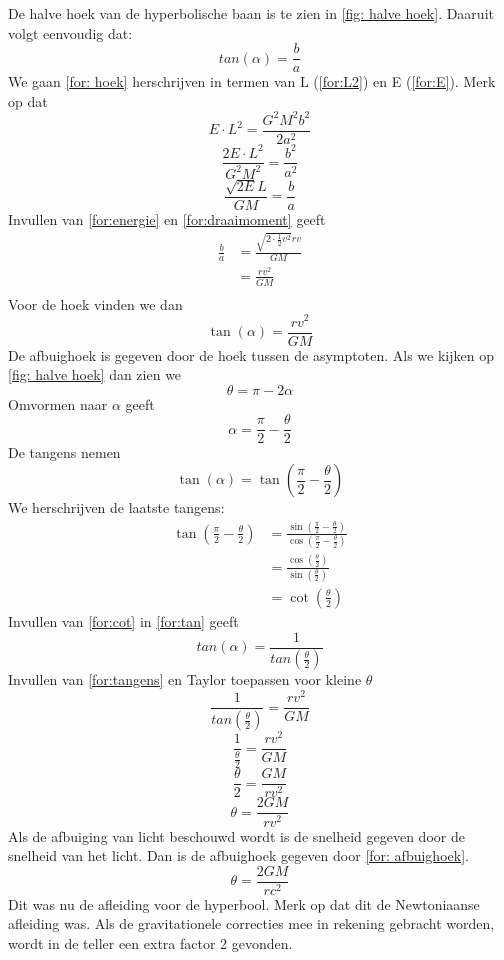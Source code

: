 De halve hoek van de hyperbolische baan is te zien in \cref{fig: halve hoek}. Daaruit volgt eenvoudig dat:
\begin{equation}
    tan(\alpha) = \frac{b}{a}
    \label{for: hoek}
\end{equation}
We gaan \cref{for: hoek} herschrijven in termen van L (\cref{for:L2}) en E (\cref{for:E}).
Merk op dat
$$E\cdot L^{2}=\frac{G^{2}M^{2}b^{2}}{2a^{2}}$$
$$\frac{2E\cdot L^{2}}{G^{2}M^{2}}=\frac{b^{2}}{a^{2}}$$
$$\frac{\sqrt{2E}L}{GM}=\frac{b}{a}$$
Invullen van \cref{for:energie} en \cref{for:draaimoment} geeft
\begin{align}
    \frac{b}{a}&=\frac{\sqrt{2\cdot\frac{1}{2}v^{2}}rv}{GM}\nonumber \\
     &= \frac{rv^{2}}{GM}\nonumber\\
\end{align}
Voor de hoek vinden we dan
\begin{equation}
    \tan(\alpha) =\frac{rv^{2}}{GM} 
    \label{for:tangens}
\end{equation}
De afbuighoek is gegeven door de hoek tussen de asymptoten. Als we kijken op \cref{fig: halve hoek} dan zien we
$$\theta = \pi - 2\alpha$$
Omvormen naar $\alpha$ geeft
$$\alpha = \frac{\pi}{2}-\frac{\theta}{2}$$
De tangens nemen
\begin{equation}
    \tan(\alpha) = \tan\left(\frac{\pi}{2}-\frac{\theta}{2}\right)
    \label{for:tan}
\end{equation}
We herschrijven de laatste tangens:
\begin{align}
    \tan\left(\frac{\pi}{2}-\frac{\theta}{2}\right)&=\frac{\sin(\frac{\pi}{2}-\frac{\theta}{2})}{\cos(\frac{\pi}{2}-\frac{\theta}{2})}\nonumber\\
    &= \frac{\cos(\frac{\theta}{2})}{\sin(\frac{\theta}{2})}\nonumber \\
    & = \cot(\frac{\theta}{2})
    \label{for:cot}
\end{align}
Invullen van \cref{for:cot} in \cref{for:tan} geeft
\begin{equation}
    tan(\alpha) = \frac{1}{tan(\frac{\theta}{2})}
    \label{for:afbuighoek}
\end{equation}
Invullen van \cref{for:tangens} en Taylor toepassen voor kleine $\theta$
$$\frac{1}{tan(\frac{\theta}{2})} = \frac{rv^{2}}{GM}$$
$$\frac{1}{\frac{\theta}{2}}=\frac{rv^{2}}{GM}$$
$$\frac{\theta}{2} = \frac{GM}{rv^{2}}$$
$$\theta = \frac{2GM}{rv^{2}}$$
Als de afbuiging van licht beschouwd wordt is de snelheid gegeven door de snelheid van het licht. Dan is de afbuighoek gegeven door \cref{for: afbuighoek}.
\begin{equation}
    \theta = \frac{2GM}{rc^{2}}
    \label{for: afbuighoek}
\end{equation}
Dit was nu de afleiding voor de hyperbool. Merk op dat dit de Newtoniaanse afleiding was. Als de gravitationele correcties mee in rekening gebracht worden, wordt in de teller een extra factor 2 gevonden.
